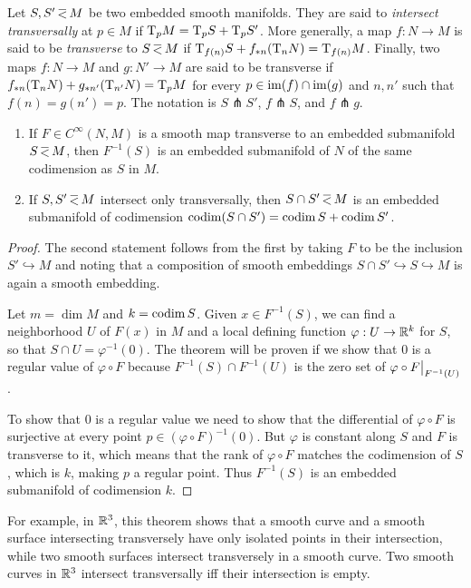 \begin{defn}[Transversality]
Let $S,S'\emb M$ be two embedded smooth manifolds. They are said to \emph{intersect transversally} at $p\in M$ if $\mathrm{T}_p M=\mathrm{T}_p S+ \mathrm{T}_p S'$. More generally, a map $f:N\to M$ is said to be \emph{transverse} to $S\emb M$ if $\mathrm{T}_{f(n)}S+f_{\ast n}(\mathrm{T}_n N)=\mathrm{T}_{f(n)}M$. Finally, two maps $f:N\to M$ and $g:N'\to M$ are said to be transverse if $f_{\ast n}(\mathrm{T}_nN)+g_{\ast n'}(\mathrm{T}_{n'}N)=\mathrm{T}_p M$ for every $p\in\operatorname{im}(f)\cap\operatorname{im}(g)$ and $n,n'$ such that $f(n)=g(n')=p$. The notation is $S\pitchfork S'$, $f\pitchfork S$, and $f\pitchfork g$.
\end{defn}
\begin{thm}\label{thm 6.30 Lee}
\begin{enumerate}
    \item If $F\in C^\infty(N,M)$ is a smooth map transverse to an embedded submanifold $S\emb M$, then $F^{-1}(S)$ is an embedded submanifold of $N$ of the same codimension as $S$ in $M$.
    \item If $S,S'\emb M$ intersect only transversally, then $S\cap S'\emb M$ is an embedded submanifold of codimension  $\operatorname{codim}(S\cap S')=\operatorname{codim} S+\operatorname{codim} S'$.
\end{enumerate}
\end{thm}
\begin{proof}
The second statement follows from the first by taking $F$ to be the inclusion $S'\hookrightarrow M$ and noting that a composition of smooth embeddings $S\cap S'\hookrightarrow S\hookrightarrow M$ is again a smooth embedding.

Let $m=\dim M$ and $k=\operatorname{codim} S$. Given $x\in F^{-1}(S)$, we can find a neighborhood $U$ of $F(x)$ in $M$ and a local defining function $\varphi:U\to \mathbb{R}^k$ for $S$, so that $S\cap U=\varphi^{-1}(0)$. The theorem will be proven if we show that $0$ is a regular value of $\varphi\circ F$ because $F^{-1}(S)\cap F^{-1}(U)$ is the zero set of $\varphi\circ \restr{F}{F^{-1}(U)}$.

To show that $0$ is a regular value we need to show that the differential of $\varphi\circ F$ is surjective at every point $p\in (\varphi\circ F)^{-1}(0)$. But $\varphi$ is constant along $S$ and $F$ is transverse to it, which means that the rank of $\varphi\circ F$ matches the codimension of $S$, which is $k$, making $p$ a regular point. Thus $F^{-1}(S)$ is an embedded submanifold of codimension $k$.
\end{proof}

For example, in $\mathbb{R}^3$, this theorem shows that a smooth curve and a smooth surface intersecting transversely have only isolated points in their intersection, while two smooth surfaces intersect transversely in a smooth curve. Two smooth curves in $\mathbb{R}^3$ intersect transversally iff their intersection is empty.

